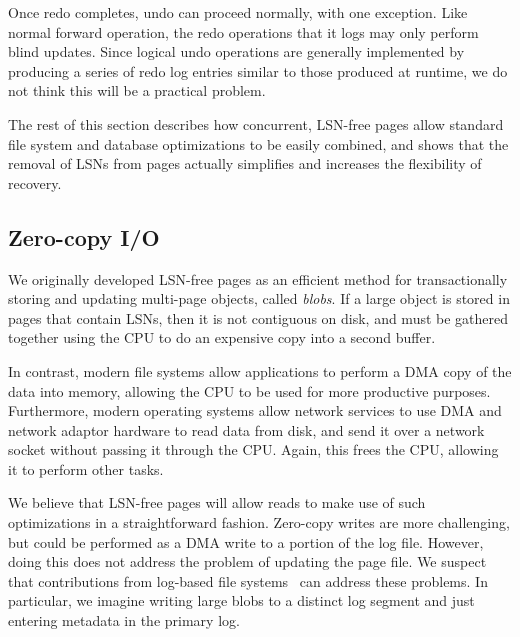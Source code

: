 \documentclass[letterpaper,twocolumn,10pt]{article}
\newcommand{\yad}{Stasis\xspace}
\begin{document}
Once redo completes, undo can proceed normally, with one exception.
Like normal forward operation, the redo operations that it logs may
only perform blind updates.  Since logical undo operations are
generally implemented by producing a series of redo log entries
similar to those produced at runtime, we do not think this will be a
practical problem.

The rest of this section describes how concurrent, LSN-free pages 
allow standard file system and database optimizations to be easily
combined, and shows that the removal of LSNs from pages actually
simplifies and increases the flexibility of recovery.

\subsection{Zero-copy I/O} 

We originally developed LSN-free pages as an efficient method for
transactionally storing and updating multi-page objects, called {\em
blobs}.  If a large object is stored in pages that contain LSNs, then it is not contiguous on disk, and must be gathered together using the CPU to do an expensive copy into a second buffer.

In contrast, modern file systems allow applications to
perform a DMA copy of the data into memory, allowing the CPU to be used for
more productive purposes.  Furthermore, modern operating systems allow
network services to use DMA and network adaptor hardware to read data
from disk, and send it over a network socket without passing it
through the CPU.  Again, this frees the CPU, allowing it to perform
other tasks.

We believe that LSN-free pages will allow reads to make use of such
optimizations in a straightforward fashion.  Zero-copy writes are
 more challenging, but could be performed as a DMA write to
a portion of the log file. However, doing this does not address the problem of updating the page
file.  We suspect that contributions from log-based file
systems~\cite{lfs} can address these problems. In
particular, we imagine writing large blobs to a distinct log segment and just entering metadata in the primary log.

\end{document}
